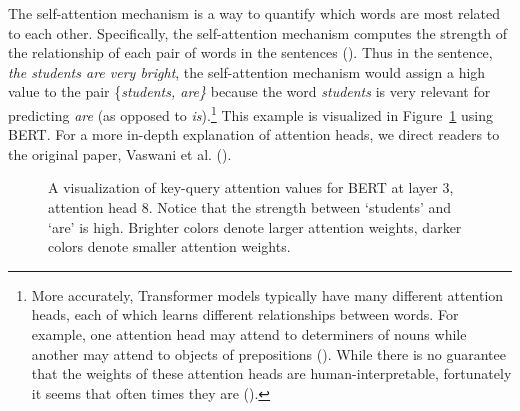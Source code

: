 \documentclass[
  12pt,
  letterpaper,
]{scrreport}
\begin{document}
The self-attention mechanism is a way to quantify which words are most
related to each other. Specifically, the self-attention mechanism
computes the strength of the relationship of each pair of words in the
sentences (). Thus in the sentence, \emph{the students are very bright}, the
self-attention mechanism would assign a high value to the pair
\{\emph{students, are\}} because the word \emph{students} is very
relevant for predicting \emph{are} (as opposed to \emph{is}).\footnote{More
  accurately, Transformer models typically have many different attention
  heads, each of which learns different relationships between words. For
  example, one attention head may attend to determiners of nouns while
  another may attend to objects of prepositions
  (). While
  there is no guarantee that the weights of these attention heads are
  human-interpretable, fortunately it seems that often times they are
  ().} This
example is visualized in Figure~\ref{fig-attentionplot} using BERT. For
a more in-depth explanation of attention heads, we direct readers to the
original paper, Vaswani et al.
().

\begin{figure}[htbp]

\caption{\label{fig-attentionplot}A visualization of key-query attention
values for BERT at layer 3, attention head 8. Notice that the strength
between `students' and `are' is high. Brighter colors denote larger
attention weights, darker colors denote smaller attention weights.}


\end{figure}%
\end{document}
